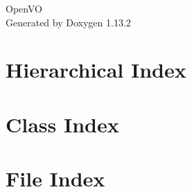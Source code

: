 \documentclass[twoside]{book}
\newcommand{\+}{\discretionary{\mbox{\scriptsize$\hookleftarrow$}}{}{}}
\newcommand{\clearemptydoublepage}{%
    \newpage{\pagestyle{empty}\cleardoublepage}%
  }
\begin{document}
  \raggedbottom
    \hypersetup{pageanchor=false,
                bookmarksnumbered=true,
                pdfencoding=unicode
               }
  \begin{titlepage}
  \vspace*{7cm}
  \begin{center}%
  {\Large Open\+VO}\\
  \vspace*{1cm}
  {\large Generated by Doxygen 1.13.2}\\
  \end{center}
  \end{titlepage}
  \clearemptydoublepage
  \tableofcontents
  \clearemptydoublepage
  \hypersetup{pageanchor=true}
\chapter{Hierarchical Index}

\chapter{Class Index}

\chapter{File Index}

\end{document}
